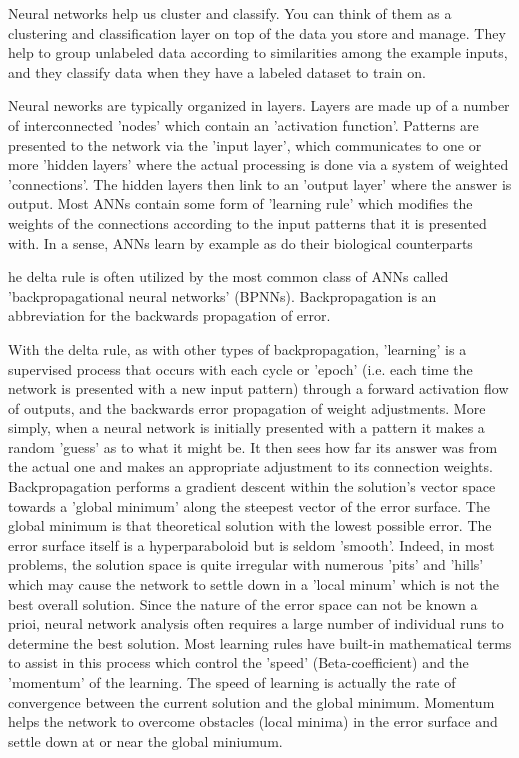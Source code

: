 Neural networks help us cluster and classify. You can think of them as a clustering and classification layer on top of the data you store and manage. They help to group unlabeled data according to similarities among the example inputs, and they classify data when they have a labeled dataset to train on.

Neural neworks are typically organized in layers. Layers are made up of a number of interconnected 'nodes' which contain an 'activation function'. Patterns are presented to the network via the 'input layer', which communicates to one or more 'hidden layers' where the actual processing is done via a system of weighted 'connections'. The hidden layers then link to an 'output layer' where the answer is output. Most ANNs contain some form of 'learning rule' which modifies the weights of the connections according to the input patterns that it is presented with. In a sense, ANNs learn by example as do their biological counterparts

he delta rule is often utilized by the most common class of ANNs called 'backpropagational neural networks' (BPNNs). Backpropagation is an abbreviation for the backwards propagation of error.

With the delta rule, as with other types of backpropagation, 'learning' is a supervised process that occurs with each cycle or 'epoch' (i.e. each time the network is presented with a new input pattern) through a forward activation flow of outputs, and the backwards error propagation of weight adjustments. More simply, when a neural network is initially presented with a pattern it makes a random 'guess' as to what it might be. It then sees how far its answer was from the actual one and makes an appropriate adjustment to its connection weights. Backpropagation performs a gradient descent within the solution's vector space towards a 'global minimum' along the steepest vector of the error surface. The global minimum is that theoretical solution with the lowest possible error. The error surface itself is a hyperparaboloid but is seldom 'smooth'.  Indeed, in most problems, the solution space is quite irregular with numerous 'pits' and 'hills' which may cause the network to settle down in a 'local minum' which is not the best overall solution. Since the nature of the error space can not be known a prioi, neural network analysis often requires a large number of individual runs to determine the best solution. Most learning rules have built-in mathematical terms to assist in this process which control the 'speed' (Beta-coefficient) and the 'momentum' of the learning. The speed of learning is actually the rate of convergence between the current solution and the global minimum. Momentum helps the network to overcome obstacles (local minima) in the error surface and settle down at or near the global miniumum.

